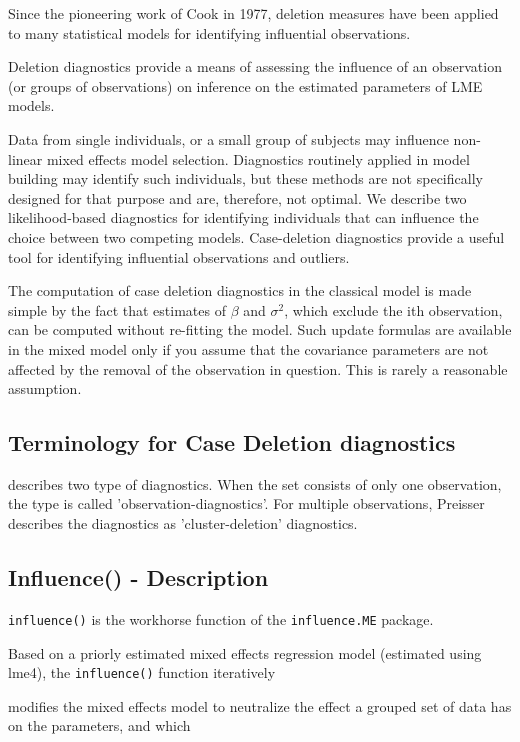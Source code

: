 \documentclass[Main.tex]{subfiles}
\begin{document}
		Since the pioneering work of Cook in 1977, deletion measures have been applied to many statistical models for identifying influential observations.
		
		Deletion diagnostics provide a means of assessing the influence of an observation (or groups of observations) on inference on the estimated parameters of LME models.
		
		Data from single individuals, or a small group of subjects may influence non-linear mixed effects model selection. Diagnostics routinely applied in model building may identify such individuals, but these methods are not specifically designed for that purpose and are, therefore, not optimal. We describe two likelihood-based diagnostics for identifying individuals that can influence the choice between two competing models.
		Case-deletion diagnostics provide a useful tool for identifying influential observations and outliers.
		
		The computation of case deletion diagnostics in the classical model is made simple by the fact that estimates of $\beta$ and $\sigma^2$, which exclude the ith observation, can be computed without re-fitting the model. Such update formulas are available in the mixed model only if you assume that the covariance parameters are not affected by the removal of the observation in question. This is rarely a reasonable assumption.
		
		\subsection{Terminology for Case Deletion diagnostics} %
		
		\citet{preisser} describes two type of diagnostics. When the set consists of only one observation, the type is called
		'observation-diagnostics'. For multiple observations, Preisser describes the diagnostics as 'cluster-deletion' diagnostics.
	\subsection*{Influence() - Description}
	\texttt{influence()} is the workhorse function of the \texttt{influence.ME} package. 
	
	
	Based on a priorly estimated mixed effects regression model (estimated using lme4), the \texttt{influence()} function iteratively 
	
	modifies the mixed effects model to neutralize the effect a grouped set of data has on the parameters, and which 
	
\end{document}
